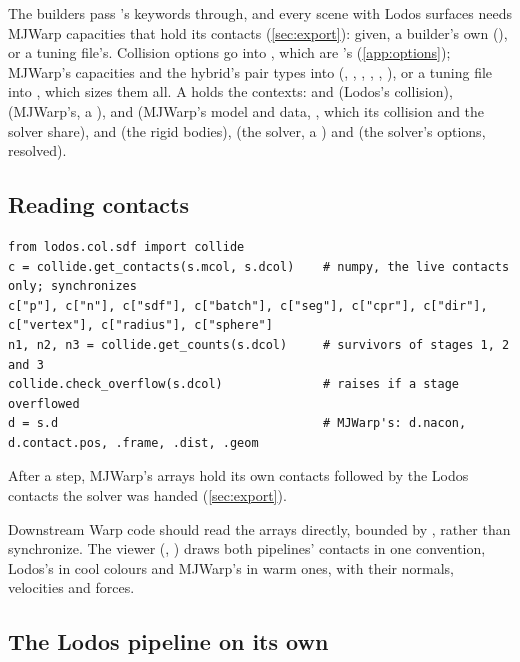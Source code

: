 The builders pass 's keywords through, and every scene with Lodos surfaces needs MJWarp capacities that hold its contacts (\cref{sec:export}): given, a builder's own (), or a tuning file's. Collision options go into , which are 's (\cref{app:options}); MJWarp's capacities and the hybrid's pair types into  (, , , , , ), or a tuning file into , which sizes them all. A  holds the contexts:  and  (Lodos's collision),  (MJWarp's, a ),  and  (MJWarp's model and data, , which its collision and the solver share),  and  (the rigid bodies),  (the solver, a ) and  (the solver's options, resolved).

\subsection{Reading contacts}\label{sec:readcontacts}

\begin{lstlisting}
from lodos.col.sdf import collide
c = collide.get_contacts(s.mcol, s.dcol)    # numpy, the live contacts only; synchronizes
c["p"], c["n"], c["sdf"], c["batch"], c["seg"], c["cpr"], c["dir"], c["vertex"], c["radius"], c["sphere"]
n1, n2, n3 = collide.get_counts(s.dcol)     # survivors of stages 1, 2 and 3
collide.check_overflow(s.dcol)              # raises if a stage overflowed
d = s.d                                     # MJWarp's: d.nacon, d.contact.pos, .frame, .dist, .geom
\end{lstlisting}

After a step, MJWarp's arrays hold its own contacts followed by the Lodos contacts the solver was handed (\cref{sec:export}).

Downstream Warp code should read the  arrays directly, bounded by , rather than synchronize. The viewer (, ) draws both pipelines' contacts in one convention, Lodos's in cool colours and MJWarp's in warm ones, with their normals, velocities and forces.

\subsection{The Lodos pipeline on its own}\label{sec:standalone}

